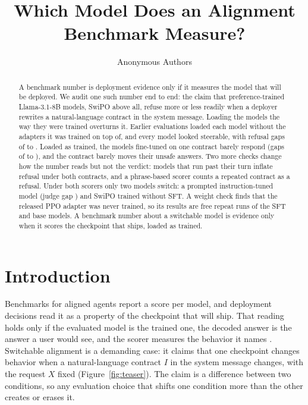 \documentclass[letterpaper]{article} %
\title{Which Model Does an Alignment Benchmark Measure?}  %
\author{Anonymous Authors}
\begin{document}
\maketitle

\begin{abstract}
A benchmark number is deployment evidence only if it measures the model that will be deployed. We audit one such number end to end: the claim that preference-trained Llama-3.1-8B models, SwiPO above all, refuse more or less readily when a deployer rewrites a natural-language contract in the system message. Loading the models the way they were trained overturns it. Earlier evaluations loaded each model without the adapters it was trained on top of, and every model looked steerable, with refusal gaps of \nFinalLo{} to \nFinalHi{}. Loaded as trained, the models fine-tuned on one contract barely respond (gaps of \nTrainedLo{} to \nTrainedHi{}), and the contract barely moves their unsafe answers. Two more checks change how the number reads but not the verdict: models that run past their turn inflate refusal under both contracts, and a phrase-based scorer counts a repeated contract as a refusal. Under both scorers only two models switch: a prompted instruction-tuned model (judge gap \nInstructJudge{}) and SwiPO trained without SFT. A weight check finds that the released PPO adapter was never trained, so its results are free repeat runs of the SFT and base models. A benchmark number about a switchable model is evidence only when it scores the checkpoint that ships, loaded as trained.
\end{abstract}


\section{Introduction}

Benchmarks for aligned agents report a score per model, and deployment decisions read it as a property of the checkpoint that will ship. That reading holds only if the evaluated model is the trained one, the decoded answer is the answer a user would see, and the scorer measures the behavior it names \cite{biderman2024lessons}. Switchable alignment is a demanding case: it claims that one checkpoint changes behavior when a natural-language contract $I$ in the system message changes, with the request $X$ fixed (Figure~\ref{fig:teaser}). The claim is a difference between two conditions, so any evaluation choice that shifts one condition more than the other creates or erases it.
\end{document}
